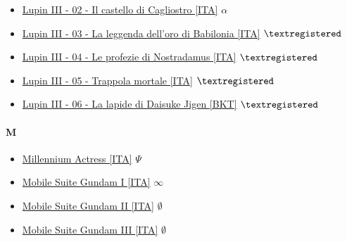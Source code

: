 \begin{itemize}
				\item \href{https://mega.nz/#!QJ0AxJBL!XY2T-QXO6vqdotvT2siM4y7qDEMhAPtTl-6uhc0AVsI} {Lupin III - 02 - Il castello di Cagliostro [ITA]} $\alpha$   \\  
				\item \href{https://mega.nz/#!KiAkhAhD!KydNAuvVfrsLKrSZv5Ul1EJsLx909WSJVuVYNIppXCo} {Lupin III - 03 - La leggenda dell'oro di Babilonia [ITA]} $\textregistered$   \\ 
				\item \href{https://mega.nz/#!OvBA1biA!TFx7oOIU5eNDztshs5rEBcEtW4i8lCsXxQVMASOg8KA} {Lupin III - 04 - Le profezie di Nostradamus [ITA]} $\textregistered$   \\ 
				\item \href{https://mega.nz/#!mrJTBCzA!RsSjWUy1J82kMN_eeCdRte2XkhoQZot2paT1KMktBLc} {Lupin III - 05 - Trappola mortale [ITA]} $\textregistered$   \\ 
				\item \href{https://mega.nz/#F!OnRywZyS!Cq-TGb9I-XZ9Z-cANIMkFQ} {Lupin III - 06 - La lapide di Daisuke Jigen [BKT]} $\textregistered$   \\  
			
			\end{itemize}
			
		\paragraph{M} \hypertarget{FM}{}
			\begin{itemize}
				
				\item \href{https://mega.nz/#!YWJmzAqY!S_fYgrWsYAfFxC_0Nl3yQ7JYD3kF6annUN0Igj0MRGk} {Millennium Actress [ITA]} $\Psi$   \\
				\item \href{https://mega.nz/#!ULYk1YBL!rwkbVQlCfRqT1O2EFHPhf2-UIku61FbPK9sLLP1TwfU} {Mobile Suite Gundam I  [ITA]} $\infty$   \\
				\item \href{https://mega.nz/#!kHJRWSRS!DmvMrEY6D0HQRTam0XS3AJjutem3Jaoc2UxdPjMN90M} {Mobile Suite Gundam II  [ITA]} $\emptyset$   \\
				\item \href{https://mega.nz/#!FaBwDBQT!ktUjs52k3i55Umq8FD1gAT4XD766nZDemHdSokgDXE4} {Mobile Suite Gundam III  [ITA]} $\emptyset$   \\
				
				
			\end{itemize}
		
